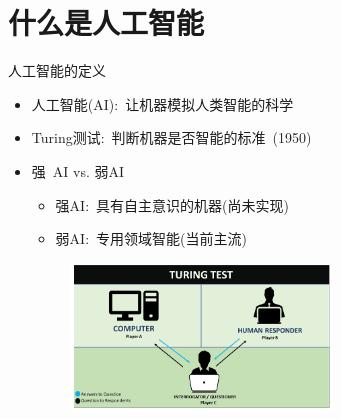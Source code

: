 \section{什么是人工智能}
\begin{frame}{人工智能的定义}
  \begin{itemize}
	  \item 人工智能\textrm{(AI)}:~让机器模拟人类智能的科学
	  \item \textrm{Turing}测试:~判断机器是否智能的标准~\textrm{(1950)}
	  \item 强~\textrm{AI} \textrm{vs.} 弱\textrm{AI}
		  \vskip 2pt
    \begin{itemize}
	    \item 强\textrm{AI}:~具有自主意识的机器(尚未实现)
	    \item 弱\textrm{AI}:~专用领域智能(当前主流)
    \end{itemize}
  \end{itemize}
\begin{figure}[h!]
\vspace*{-0.10in}
\centering
\includegraphics[height=1.55in, width=3.2in, viewport=0 0 2250 1230,clip]{Figures/The_Turing-Test.png}
\label{Turing_TEST}
\end{figure}
\end{frame}

